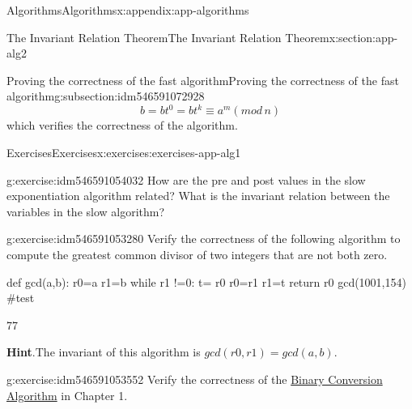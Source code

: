 \documentclass[oneside,10pt,]{book}
\newcommand{\blocktitlefont}{\relax}
\numberwithin{equation}{section}
\begin{document}
\begin{appendixptx}{Algorithms}{}{Algorithms}{}{}{x:appendix:app-algorithms}
\begin{sectionptx}{The Invariant Relation Theorem}{}{The Invariant Relation Theorem}{}{}{x:section:app-alg2}
\begin{subsectionptx}{Proving the correctness of the fast algorithm}{}{Proving the correctness of the fast algorithm}{}{}{g:subsection:idm546591072928}
\begin{equation*}
b = b t^0 = b t^k \equiv a^m(mod\,n)
\end{equation*}
which verifies the correctness of the algorithm.%
\end{subsectionptx}
%
%
\typeout{************************************************}
\typeout{************************************************}
%
\begin{exercises-subsection}{Exercises}{}{Exercises}{}{}{x:exercises:exercises-app-alg1}
\begin{divisionexercise}{1}{}{}{g:exercise:idm546591054032}%
How are the pre and post values in the slow exponentiation algorithm related? What is the invariant relation between the variables in the slow algorithm?%
\end{divisionexercise}%
\begin{divisionexercise}{2}{}{}{g:exercise:idm546591053280}%
Verify the correctness of the following algorithm to compute the greatest common divisor of two integers that are not both zero.%
\begin{sageinput}
def gcd(a,b):
    r0=a
    r1=b
    while r1 !=0:
        t= r0 %
        r0=r1
        r1=t
    return r0
gcd(1001,154)  #test
\end{sageinput}
\begin{sageoutput}
77
\end{sageoutput}
\par\smallskip%
\noindent\textbf{\blocktitlefont Hint}.\hypertarget{g:hint:idm546591051616}{}\quad{}The invariant of this algorithm is \(gcd(r0,r1)=gcd(a,b)\).%
\end{divisionexercise}%
\begin{divisionexercise}{3}{}{}{g:exercise:idm546591053552}%
Verify the correctness of the \hyperref[x:algorithm:binary-conversion-algorithm]{Binary Conversion Algorithm} in Chapter 1.%
\end{divisionexercise}%
\end{exercises-subsection}
\end{sectionptx}
\end{appendixptx}
%
%
\typeout{************************************************}
\typeout{************************************************}
%
\end{document}
